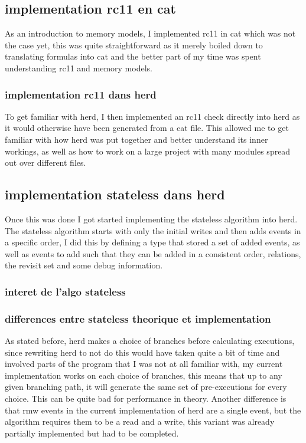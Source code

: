 \documentclass[a4]{article}
\begin{document}
\subsection{implementation rc11 en cat}

As an introduction to memory models, I implemented rc11 in cat which was not the case yet, this was quite straightforward as it merely boiled down to translating formulas into cat and the better part of my time was spent understanding rc11 and memory models.

\subsubsection{implementation rc11 dans herd}

To get familiar with herd, I then implemented an rc11 check directly into herd as it would otherwise have been generated from a cat file. This allowed me to get familiar with how herd was put together and better understand its inner workings, as well as how to work on a large project with many modules spread out over different files.

\subsection{implementation stateless dans herd}

Once this was done I got started implementing the stateless algorithm into herd. The stateless algorithm starts with only the initial writes and then adds events in a specific order, I did this by defining a type that stored a set of added events, as well as events to add such that they can be added in a consistent order, relations, the revisit set and some debug information.

\subsubsection{interet de l'algo stateless}

\subsubsection{differences entre stateless theorique et implementation}

As stated before, herd makes a choice of branches before calculating executions, since rewriting herd to not do this would have taken quite a bit of time and involved parts of the program that I was not at all familiar with, my current implementation works on each choice of branches, this means that up to any given branching path, it will generate the same set of pre-executions for every choice. This can be quite bad for performance in theory. Another difference is that rmw events in the current implementation of herd are a single event, but the algorithm requires them to be a read and a write, this variant was already partially implemented but had to be completed.
\end{document}
